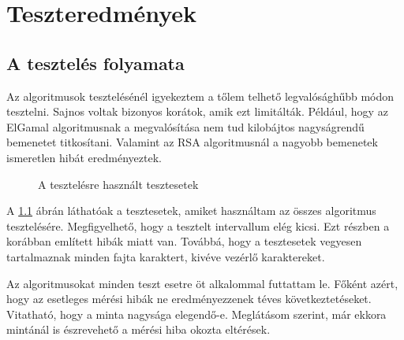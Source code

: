 \documentclass[12pt]{report} %
\begin{document}
\chapter{Teszteredmények} %

\section{A tesztelés folyamata} %

Az algoritmusok tesztelésénél igyekeztem a tőlem telhető legvalósághűbb módon tesztelni. Sajnos voltak bizonyos korátok, amik ezt limitálták. Például, hogy az ElGamal algoritmusnak a megvalósítása nem tud kilobájtos nagyságrendű bemenetet titkosítani. Valamint az RSA algoritmusnál a nagyobb bemenetek ismeretlen hibát eredményeztek.

\begin{figure}[H]
    \centering %
    \caption{A tesztelésre használt tesztesetek} %
    \label{fig:TestCases} %
\end{figure}

A \ref{fig:TestCases} ábrán láthatóak a tesztesetek, amiket használtam az összes algoritmus tesztelésére. Megfigyelhető, hogy a tesztelt intervallum elég kicsi. Ezt részben a korábban említett hibák miatt van. Továbbá, hogy a tesztesetek vegyesen tartalmaznak minden fajta karaktert, kivéve vezérlő karaktereket.

Az algoritmusokat minden teszt esetre öt alkalommal futtattam le. Főként azért, hogy az esetleges mérési hibák ne eredményezzenek téves következtetéseket. Vitatható, hogy a minta nagysága elegendő-e. Meglátásom szerint, már ekkora mintánál is észrevehető a mérési hiba okozta eltérések.
\end{document}
